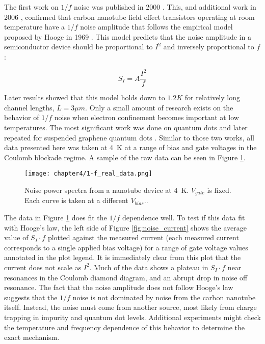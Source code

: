The first work on $1/f$ noise was published in 2000 \cite{Collins2000}. This, and additional work in 2006 \cite{Ishigami2006}, confirmed that carbon nanotube field effect transistors operating at room temperature have a $1/f$ noise amplitude that follows the empirical model proposed by Hooge in 1969 \cite{Hooge1969}. This model predicts that the noise amplitude in a semiconductor device should be proportional to $I^2$ and inversely proportional to $f$:

\begin{equation}
    \label{eq:hooge}
    S_{I} = A\frac{I^2}{f}
\end{equation}

Later results \cite{Tobias2008} showed that this model holds down to $1.2K$ for relatively long channel lengths, $L=3\mu m$. Only a small amount of research exists on the behavior of $1/f$ noise when electron confinement becomes important at low temperatures. The most significant work was done on  quantum dots \cite{Jung2004} and later repeated for suspended graphene quantum dots \cite{Song2015}. Similar to those two works, all data presented here was taken at \SI{4}{\kelvin} at a range of bias and gate voltages in the Coulomb blockade regime. A sample of the raw data can be seen in Figure \ref{fig:1-f_data}.

\begin{figure}
    \centering
    \texttt{[image: chapter4/1-f\_real\_data.png]}
    \caption{Noise power spectra from a nanotube device at \SI{4}{\kelvin}. $V_{gate}$ is fixed. Each curve is taken at a different $V_{bias}.$.}
    \label{fig:1-f_data}
\end{figure}

The data in Figure \ref{fig:1-f_data} does fit the $1/f$ dependence well. To test if this data fit with Hooge's law, the left side of Figure \ref{fig:noise_current} shows the average value of $S_I \cdot f$ plotted against the measured current (each measured current corresponds to a single applied bias voltage) for a range of gate voltage values annotated in the plot legend. It is immediately clear from this plot that the current does not scale as $I^2$. Much of the data shows a plateau in $S_I \cdot f$ near resonances in the Coulomb diamond diagram, and an abrupt drop in noise off resonance. The fact that the noise amplitude does not follow Hooge's law suggests that the $1/f$ noise is not dominated by noise from the carbon nanotube itself. Instead, the noise must come from another source, most likely from charge trapping in impurity and quantum dot levels. Additional experiments might check the temperature and frequency dependence of this behavior to determine the exact mechanism.


